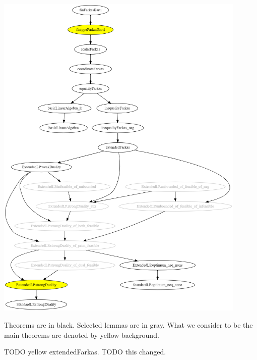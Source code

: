\documentclass[]{article}
\renewcommand{\.}{\hskip .75pt}
\begin{document}
\includegraphics[width=0.9\textwidth]{theorems.png}

Theorems are in black. Selected lemmas are in gray.
What we consider to be the main theorems are
denoted by yellow background.

TODO yellow extendedFarkas.
{\color{blue} TODO this changed.}
\end{document}
